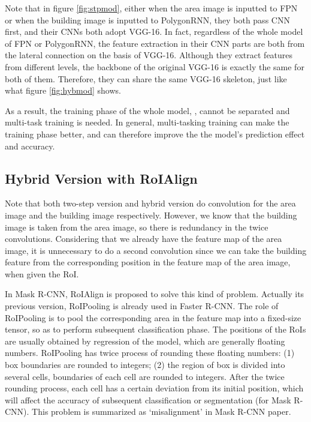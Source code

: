 Note that in figure \ref{fig:stpmod}, either when the area image is inputted to FPN or when the building image is inputted to PolygonRNN, they both pass CNN first, and their CNNs both adopt VGG-16. In fact, regardless of the whole model of FPN or PolygonRNN, the feature extraction in their CNN parts are both from the lateral connection on the basis of VGG-16. Although they extract features from different levels, the backbone of the original VGG-16 is exactly the same for both of them. Therefore, they can share the same VGG-16 skeleton, just like what figure \ref{fig:hybmod} shows.



As a result, the training phase of the whole model, \modelnameshort, cannot be separated and multi-task training is needed. In general, multi-tasking training can make the training phase better, and can therefore improve the the model's prediction effect and accuracy.

\subsection{Hybrid Version with RoIAlign}\label{algmod}

Note that both two-step version and hybrid version do convolution for the area image and the building image respectively. However, we know that the building image is taken from the area image, so there is redundancy in the twice convolutions. Considering that we already have the feature map of the area image, it is unnecessary to do a second convolution since we can take the building feature from the corresponding position in the feature map of the area image, when given the RoI.

In Mask R-CNN, RoIAlign is proposed to solve this kind of problem. Actually its previous version, RoIPooling is already used in Faster R-CNN. The role of RoIPooling is to pool the corresponding area in the feature map into a fixed-size tensor, so as to perform subsequent classification phase. The positions of the RoIs are usually obtained by regression of the model, which are generally floating numbers. RoIPooling has twice process of rounding these floating numbers: (1) box boundaries are rounded to integers; (2) the region of box is divided into several cells, boundaries of each cell are rounded to integers. After the twice rounding process, each cell has a certain deviation from its initial position, which will affect the accuracy of subsequent classification or segmentation (for Mask R-CNN). This problem is summarized as `misalignment' in Mask R-CNN paper.

